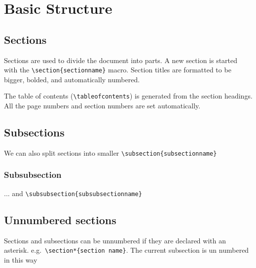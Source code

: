 \documentclass[11pt, twoside]{article}
\begin{document}
\newpage
{}
\setcounter{page}{1}

\section{Basic Structure}

\subsection{Sections}
Sections are used to divide the document into parts. A new section is started with the \lstinline|\section{sectionname}| macro. Section titles are formatted to be bigger, bolded, and automatically numbered.

The table of contents (\lstinline{\tableofcontents}) is generated from the section headings. All the page numbers and section numbers are set automatically.

\subsection{Subsections}
We can also split sections into smaller \lstinline|\subsection{subsectionname}|
\subsubsection{Subsubsection}
... and \lstinline|\subsubsection{subsubsectionname}|

\subsection*{Unnumbered sections}
Sections and subsections can be unnumbered if they are declared with an asterisk. e.g.\ \lstinline|\section*{section name}|. The current subsection is un numbered in this way
\end{document}
